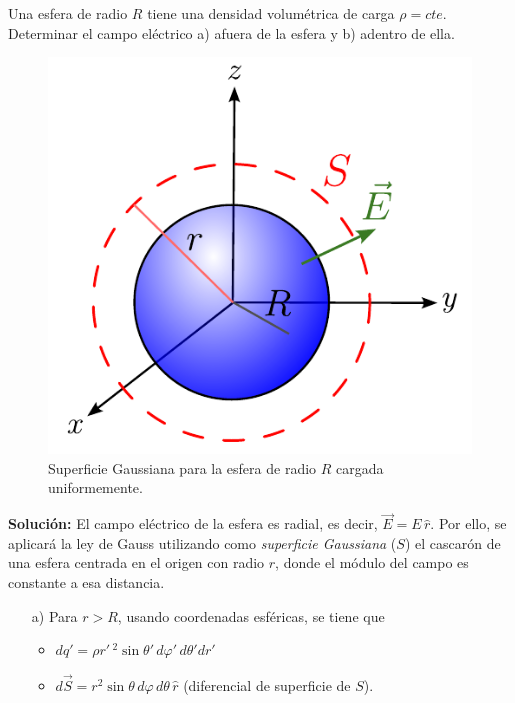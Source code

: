 \begin{ejemplo}
     Una esfera de radio $R$ tiene una densidad volumétrica de carga $\rho = cte$. Determinar el campo eléctrico a) afuera de la esfera y b) adentro de ella.

\begin{figure}[H]
    \centering
    \includegraphics[scale = 0.7]{Figuras/Ej-Gauss-1.pdf}
    \caption{Superficie Gaussiana para la esfera de radio $R$ cargada uniformemente.}
    \label{fig:Ej-Gauss-1}
\end{figure}

\textbf{Solución:} El campo eléctrico de la esfera es radial, es decir, $\vec{E} = E \,\hat{r}$. Por ello, se aplicará la ley de Gauss utilizando como \textit{superficie Gaussiana} ($S$) el cascarón de una esfera centrada en el origen con radio $r$, donde el módulo del campo es constante a esa distancia.

\begin{itemize}
\item[a)] Para $r > R$, usando coordenadas esféricas, se tiene que

\begin{itemize}
\item $dq' = \rho r'\,^2 \sin \theta ' \,d\varphi'\, d\theta' dr'$ 

\item $d\vec{S} = r^2 \sin \theta \,d\varphi\, d\theta \, \hat{r}$ (diferencial de superficie de $S$).
\end{itemize}


\end{itemize}
\end{ejemplo}
